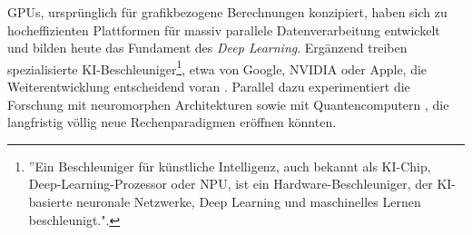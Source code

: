 GPUs, ursprünglich für grafikbezogene Berechnungen konzipiert, haben sich zu hocheffizienten Plattformen für massiv parallele Datenverarbeitung entwickelt und bilden heute das Fundament des \textit{Deep Learning}. Ergänzend treiben spezialisierte KI-Beschleuniger\footnote{''Ein Beschleuniger für künstliche Intelligenz, auch bekannt als KI-Chip, Deep-Learning-Prozessor oder \ac{NPU}, ist ein Hardware-Beschleuniger, der KI-basierte neuronale Netzwerke, Deep Learning und maschinelles Lernen beschleunigt."\cite{ibm_was_2024}.}, etwa von Google, NVIDIA oder Apple, die Weiterentwicklung entscheidend voran \cite{richsrdson_10_2025}. Parallel dazu experimentiert die Forschung mit neuromorphen Architekturen \parencite[S.~22]{schuman_survey_2017} sowie mit Quantencomputern \parencite[S.~2f]{preskill_quantum_2018}, die langfristig völlig neue Rechenparadigmen eröffnen könnten.  

